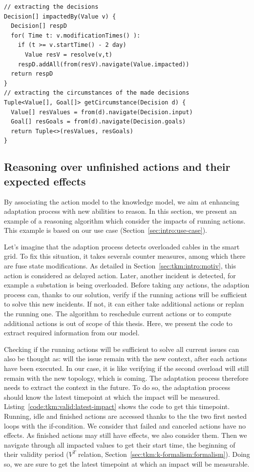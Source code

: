 \begin{lstlisting}[style=customc,caption=Get the goals used by the adaptation process from executed actions, label=code:actions-to-goals,basicstyle=\scriptsize]
// extracting the decisions
Decision[] impactedBy(Value v) {
  Decision[] respD
  for( Time t: v.modificationTimes() ):
    if (t >= v.startTime() - 2 day)
      Value resV = resolve(v,t)
    respD.addAll(from(resV).navigate(Value.impacted))
  return respD
}
// extracting the circumstances of the made decisions
Tuple<Value[], Goal[]> getCircumstance(Decision d) {
  Value[] resValues = from(d).navigate(Decision.input)
  Goal[] resGoals = from(d).navigate(Decision.goals)      
  return Tuple<>(resValues, resGoals)
} 
\end{lstlisting}

\subsection{Reasoning over unfinished actions and their expected effects}
By associating the action model to the knowledge model, we aim at enhancing adaptation process with new abilities to reason.
In this section, we present an example of a reasoning algorithm which consider the impacts of running actions.
This example is based on our use case (\cf Section~\ref{sec:intro:use-case}).

Let's imagine that the adaption process detects overloaded cables in the smart grid.
To fix this situation, it takes severals counter measures, among which there are fuse state modifications.
As detailed in Section~\ref{sec:tkm:intro:motiv}, this action is considered as delayed action.
Later, another incident is detected, for example a substation is being overloaded.
Before taking any actions, the adaption process can, thanks to our solution, verify if the running actions will be sufficient to solve this new incidents.
If not, it can either take additional actions or replan the running one.
The algorithm to reschedule current actions or to compute additional actions is out of scope of this thesis.
Here, we present the code to extract required information from our model.

Checking if the running actions will be sufficient to solve all current issues can also be thought as: will the issue remain with the new context, \ie after each actions have been executed.
In our case, it is like verifying if the second overload will still remain with the new topology, which is coming.
The adaptation process therefore needs to extract the context in the future.
To do so, the adaptation process should know the latest timepoint at which the impact will be measured.
Listing~\ref{code:tkm:valid:latest-impact} shows the code to get this timepoint.
Running, idle and finished actions are accessed thanks to the the two first nested loops with the if-condition.
We consider that failed and canceled actions have no effects.
As finished actions may still have effects, we also consider them.
Then we navigate through all impacted values to get their start time, \ie the beginning of their validity period ($V^T$ relation, \cf Section~\ref{sec:tkm:k-formalism:formalism}).
Doing so, we are sure to get the latest timepoint at which an impact will be measurable.

